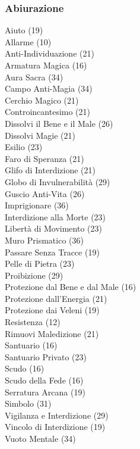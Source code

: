 \begin{multicols}{3}
	\subsubsection{Abiurazione}
	Aiuto (19)\\
	Allarme	(10)\\
	Anti-Individuazione (21)\\
	Armatura Magica (16)\\
	Aura Sacra (34)\\
	Campo Anti-Magia (34)\\
	Cerchio Magico (21)\\
	Controincantesimo (21)\\
	Dissolvi il Bene e il Male (26)\\
	Dissolvi Magie (21)\\
	Esilio (23)\\
	Faro di Speranza (21)\\
	Glifo di Interdizione (21)\\
	Globo di Invulnerabilità (29)\\
	Guscio Anti-Vita (26)\\
	Imprigionare (36)\\
	Interdizione alla Morte (23)\\
	Libertà di Movimento (23)\\
	Muro Prismatico (36)\\
	Passare Senza Tracce (19)\\
	Pelle di Pietra (23)\\
	Proibizione (29)\\
	Protezione dal Bene e dal Male (16)\\
	Protezione dall'Energia (21)\\
	Protezione dai Veleni (19)\\
	Resistenza (12)\\
	Rimuovi Maledizione (21)\\
	Santuario (16)\\
	Santuario Privato (23)\\
	Scudo (16)\\
	Scudo della Fede (16)\\
	Serratura Arcana (19)\\
	Simbolo (31)\\
	Vigilanza e Interdizione (29)\\
	Vincolo di Interdizione (19)\\
	Vuoto Mentale (34)\\
	

\end{multicols}
